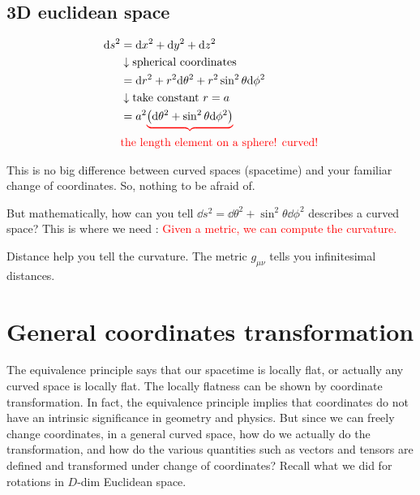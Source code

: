 \documentclass[11pt,fleqn]{book} %
\begin{document}
\subsection {3D euclidean space}
\begin{align*}
  \mathrm{d} s^2 &= \mathrm{d} x^2 + \mathrm{d} y^2 + \mathrm{d} z^2 \\
          & \downarrow \text{spherical coordinates} \\
          &= \mathrm{d} r^2 + r^2 \mathrm{d} \theta^2 + r^2 \sin ^2 \theta \mathrm{d} \phi^2 \\
          & \downarrow \text{take constant\ } r = a \\
          &= a^2 \textcolor{red}{\underbrace{\textcolor{black}{\left( \mathrm{d} \theta^2 + \sin^2 \theta \mathrm{d} \phi^2 \right)}}} \\
          & \text{\textcolor{red}{the length element on a sphere! curved!}}
\end{align*}
\begin{remark}
  This is no big difference between curved spaces (spacetime) and your familiar
  change of coordinates. So, nothing to be afraid of.
\end{remark}
But mathematically, how can you tell \(\dd s^2 = \dd \theta^2 + \sin^2 \theta
\dd \phi^2\) describes a curved space? This is where we need : \textcolor{red}{Given a metric, we can compute the curvature.}
\begin{figure*}[h]
  \centering
  
\end{figure*}
\begin{remark}
  Distance help you tell the curvature. The metric \(g_{\mu\nu}\) tells you
  infinitesimal distances.
\end{remark}

\section{General coordinates transformation}
The equivalence principle says that our spacetime is locally flat, or actually
any curved space is locally flat. The locally flatness can be shown by
coordinate transformation. In fact, the equivalence principle implies that
coordinates do not have an intrinsic significance in geometry and physics. But
since we can freely change coordinates, in a general curved space, how do we
actually do the transformation, and how do the various quantities such as
vectors and tensors are defined and transformed under change of coordinates?
Recall what we did for rotations in \(D\)-dim Euclidean space.
\end{document}
